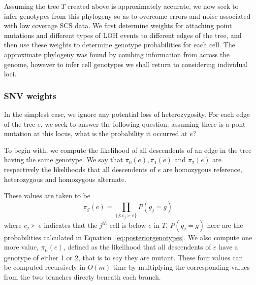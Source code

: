 \documentclass[../../main.tex]{subfiles}
\begin{document}
Assuming the tree $T$ created above is approximately accurate, we now seek to infer genotypes from this phylogeny so as to overcome errors and noise associated with low coverage SCS data.
We first determine weights for attaching point mutations and different types of LOH events to different edges of the tree, and then use these weights to determine genotype probabilities for each cell.
The approximate phylogeny was found by combing information from across the genome, however to infer cell genotypes we shall return to considering individual loci.

\subsubsection*{SNV weights}
In the simplest case, we ignore any potential loss of heterozygosity.
For each edge of the tree $e$, we seek to answer the following question: assuming there is a pont mutation at this locus, what is the probability it occurred at $e$?

To begin with, we compute the likelihood of all descendents of an edge in the tree having the same genotype.
We say that $\pi_0(e), \pi_1(e)$ and $\pi_2(e)$ are respectively the likelihoods that all descendents of $e$ are homozygous reference, heterozygous and homozygous alternate.

These values are taken to be
\begin{equation}
\pi_g(e) = \prod_{\{j:c_j\succ e\}} P(g_j = g)
\end{equation}
where $c_j\succ e$ indicates that the $j^{th}$ cell is below $e$ in $T$.
$P(g_j = g)$ here are the probabilities calculated in Equation~\eqref{eq:posteriorgenotypes}.
We also compute one more value, $\pi_\mu(e)$, defined as the likelihood that all descendents of $e$ have a genotype of either 1 or 2, that is to say they are mutant.
These four values can be computed recursively in $O(m)$ time by multiplying the corresponding values from the two branches directy beneath each branch.
\end{document}
